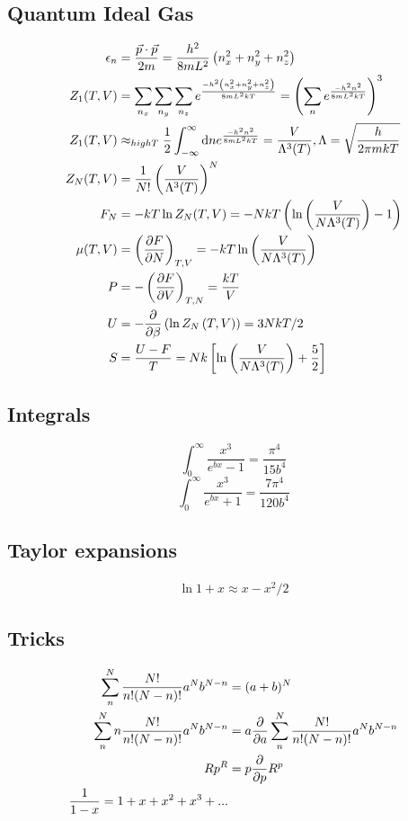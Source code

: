 \documentclass[a4paper, norsk, 8pt]{article}
\begin{document}
\begin{multicols*}{3}
\subsection*{\footnotesize Quantum Ideal Gas}
\begin{align*}
  \epsilon_n &= \frac{\vec{p}\cdot\vec{p}}{2m}  = \frac{h^2}{8mL^2}\left(n_x^2+n_y^2+n_z^2\right) \\
  Z_1(T,V) &= \sum_{n_x}\sum_{n_y}\sum_{n_z}e^{\frac{-h^2\left(n_x^2+n_y^2+n_z^2\right)}{8mL^2kT}} = \left( \sum_{n}e^{\frac{-h^2n^2}{8mL^2kT}} \right)^3 \\
  Z_1(T,V) &\approx_{high T} \frac{1}{2}\int_{-\infty}^{\infty}\mbox{d}n e^{\frac{-h^2n^2}{8mL^2kT}} = \frac{V}{\Lambda^3(T)}, \Lambda = \sqrt{\frac{h}{2\pi mkT}}\\
  Z_N(T,V) &= \frac{1}{N!}\left(\frac{V}{\Lambda^3(T)}\right)^N \\
  F_N &= -kT\ln{Z_N(T,V)} = -NkT\left( \ln{\left( \frac{V}{N\Lambda^3(T)}\right)} -1 \right)\\
  \mu(T,V) &= \left( \pdv{F}{N} \right)_{T,V} = -kT\ln{\left( \frac{V}{N\Lambda^3(T)} \right)} \\
  P &= -\left( \pdv{F}{V} \right)_{T,N} = \frac{kT}{V}\\
  U &= -\pdv{}{\beta}\left( \ln{Z_N\left(T, V\right)}\right) = 3NkT/2 \\
  S &= \frac{U-F}{T} = Nk\left[ \ln{\left( \frac{V}{N\Lambda^3(T)} \right)} + \frac{5}{2} \right]
\end{align*}

\subsection*{\footnotesize  Integrals}
$$ \int_0^{\infty} \frac{x^3}{e^{bx}-1} = \frac{\pi^4}{15b^4}$$
$$ \int_0^{\infty} \frac{x^3}{e^{bx}+1} = \frac{7\pi^4}{120b^4}$$

\subsection*{\footnotesize  Taylor expansions}
\begin{align*}
  \ln{1+x} \approx x - x^2/2
\end{align*}


\subsection*{\footnotesize  Tricks}
\begin{align*}
  \sum_{n}^{N} \frac{N!}{n!(N-n)!}a^Nb^{N-n} &= (a+b)^N \\
  \sum_{n}^{N} n\frac{N!}{n!(N-n)!}a^Nb^{N-n} &= a\pdv{}{a}\sum_{n}^{N} \frac{N!}{n!(N-n)!}a^Nb^{N-n} \\
  Rp^{R} &= p \pdv{}{p}R^{p} \\
  \frac{1}{1-x} = 1 + x + x^2 + x^3 +...
\end{align*}

\end{multicols*}
\end{document}
